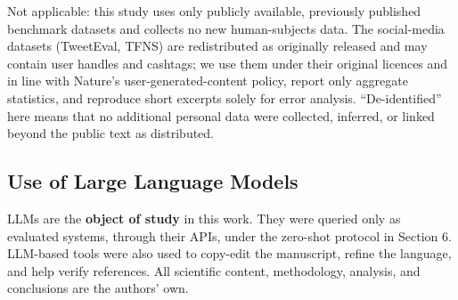 \documentclass[11pt]{article}
\begin{document}
Not applicable: this study uses only publicly available, previously
published benchmark datasets and collects no new human-subjects data.
The social-media datasets (TweetEval, TFNS) are redistributed as
originally released and may contain user handles and cashtags; we use
them under their original licences and in line with Nature's
user-generated-content policy, report only aggregate statistics, and
reproduce short excerpts solely for error analysis. ``De-identified''
here means that no additional personal data were collected, inferred, or
linked beyond the public text as distributed.

\subsection{Use of Large Language
Models}\label{use-of-large-language-models}

LLMs are the \textbf{object of study} in this work. They were queried
only as evaluated systems, through their APIs, under the zero-shot
protocol in Section 6. LLM-based tools were also used to copy-edit the
manuscript, refine the language, and help verify references. All
scientific content, methodology, analysis, and conclusions are the
authors' own.
\end{document}
